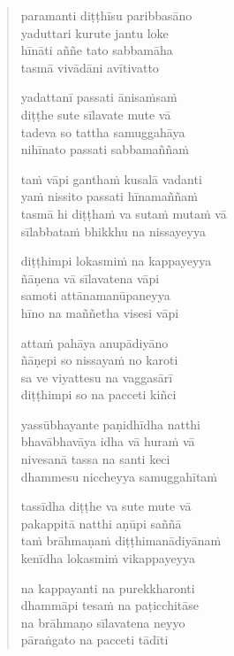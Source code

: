 

\cleartoverso

\vspace*{30mm}

\begin{verse}

paramanti diṭṭhīsu paribbasāno\\
yaduttari kurute jantu loke\\
hīnāti aññe tato sabbamāha\\
tasmā vivādāni avītivatto

yadattanī passati ānisaṁsaṁ\\
diṭṭhe sute sīlavate mute vā\\
tadeva so tattha samuggahāya\\
nihīnato passati sabbamaññaṁ

taṁ vāpi ganthaṁ kusalā vadanti\\
yaṁ nissito passati hīnamaññaṁ\\
tasmā hi diṭṭhaṁ va sutaṁ mutaṁ vā\\
sīlabbataṁ bhikkhu na nissayeyya

diṭṭhimpi lokasmiṁ na kappayeyya\\
ñāṇena vā sīlavatena vāpi\\
samoti attānamanūpaneyya\\
hīno na maññetha visesi vāpi

attaṁ pahāya anupādiyāno\\
ñāṇepi so nissayaṁ no karoti\\
sa ve viyattesu na vaggasārī\\
diṭṭhimpi so na pacceti kiñci

yassūbhayante paṇidhīdha natthi\\
bhavābhavāya idha vā huraṁ vā\\
nivesanā tassa na santi keci\\
dhammesu niccheyya samuggahītaṁ

tassīdha diṭṭhe va sute mute vā\\
pakappitā natthi aṇūpi saññā\\
taṁ brāhmaṇaṁ diṭṭhimanādiyānaṁ\\
kenīdha lokasmiṁ vikappayeyya

na kappayanti na purekkharonti\\
dhammāpi tesaṁ na paṭicchitāse\\
na brāhmaṇo sīlavatena neyyo\\
pāraṅgato na pacceti tādīti

\end{verse}

